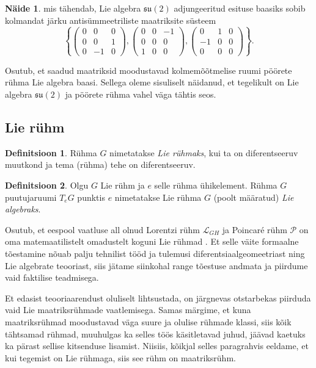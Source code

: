 \documentclass[12pt]{article}
\theoremstyle{plain}
\theoremstyle{definition}
\newtheorem{definitsioon}{Definitsioon}[section]
\newtheorem{naide}{Näide}[section]
\numberwithin{equation}{section}
\def\L{{\mathcal L}}
\def\P{{\mathcal P}}
\def\su2{{\mathfrak{ su}\left(2\right)}}
\begin{document}
\begin{naide}
mis tähendab, Lie algebra $\su2$ adjungeeritud esituse baasiks sobib 
kolmandat järku antisümmeetriliste maatriksite süsteem 
\[\left\lbrace \begin{pmatrix}
0 & 0 & 0 \\
0 & 0 & 1 \\
0 & -1 & 0
\end{pmatrix}, \begin{pmatrix}
0 & 0 & -1 \\
0 & 0 & 0 \\
1 & 0 & 0
\end{pmatrix}, \begin{pmatrix}
0 & 1 & 0 \\
-1 & 0 & 0 \\
0 & 0 & 0
\end{pmatrix} \right\rbrace.\]
\end{naide}

Osutub, et saadud maatriksid moodustavad kolmemõõtmelise ruumi 
pöörete rühma Lie algebra baasi. Sellega oleme sisuliselt näidanud, 
et tegelikult on Lie algebra $\su2$ ja pöörete rühma vahel väga 
tähtis seos.

\subsection{Lie rühm} \label{ptk:lie_ryhm}

\begin{definitsioon}
Rühma $G$ nimetatakse \emph{Lie rühmaks}, kui ta on diferentseeruv 
muutkond ja tema (rühma) tehe on diferentseeruv.
\end{definitsioon}

\begin{definitsioon}
Olgu $G$ Lie rühm ja $e$ selle rühma ühikelement. Rühma $G$ 
puutujaruumi $T_e G$ punktis $e$ nimetatakse Lie rühma $G$ (poolt 
määratud) \emph{Lie algebraks}.
\end{definitsioon}

Osutub, et eespool vaatluse all olnud Lorentzi rühm $\L_{GH}$ ja 
Poincar\'e rühm $\P$ on oma matemaatilistelt omadustelt koguni Lie 
rühmad \cite[peatükk Poincar\'e algebra]{Super}. Et selle väite 
formaalne tõestamine nõuab palju tehnilist tööd ja tulemusi 
diferentsiaalgeomeetriast ning Lie algebrate teooriast, siis jätame 
siinkohal range tõestuse andmata ja piirdume vaid faktilise 
teadmisega.

Et edasist teooriaarendust oluliselt lihtsustada, on järgnevas 
otstarbekas piirduda vaid Lie maatriksrühmade vaatlemisega. Samas 
märgime, et kuna maatriksrühmad moodustavad väga suure ja olulise 
rühmade klassi, siis kõik tähtsamad rühmad, muuhulgas ka selles töös 
käsitletavad juhud, jäävad kaetuks ka pärast sellise kitsenduse 
lisamist. Niisiis, kõikjal selles paragrahvis eeldame, et kui 
tegemist on Lie rühmaga, siis see rühm on maatriksrühm.
\end{document}
